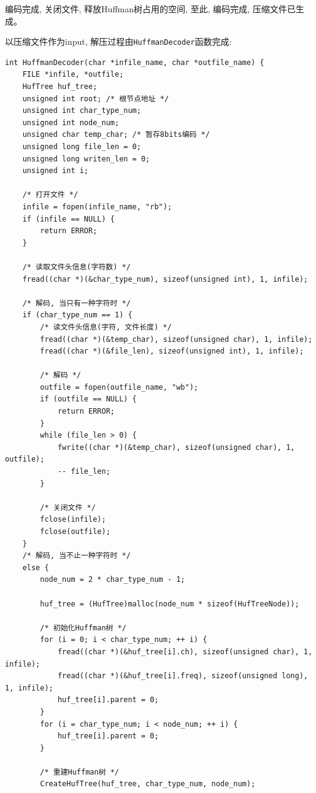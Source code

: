 \documentclass{ctexart}
\begin{document}
编码完成, 关闭文件, 释放Huffman树占用的空间, 至此, 编码完成, 压缩文件已生成。

以压缩文件作为input, 解压过程由\texttt{HuffmanDecoder}函数完成:

{\setmainfont{Courier New Bold}              
\begin{lstlisting}
int HuffmanDecoder(char *infile_name, char *outfile_name) {
    FILE *infile, *outfile;
    HufTree huf_tree;
    unsigned int root; /* 根节点地址 */
    unsigned int char_type_num;
    unsigned int node_num;
    unsigned char temp_char; /* 暂存8bits编码 */
    unsigned long file_len = 0;
    unsigned long writen_len = 0;
    unsigned int i;

    /* 打开文件 */
    infile = fopen(infile_name, "rb");
    if (infile == NULL) {
        return ERROR;
    }

    /* 读取文件头信息(字符数) */
    fread((char *)(&char_type_num), sizeof(unsigned int), 1, infile);

    /* 解码, 当只有一种字符时 */
    if (char_type_num == 1) {
        /* 读文件头信息(字符, 文件长度) */
        fread((char *)(&temp_char), sizeof(unsigned char), 1, infile);
        fread((char *)(&file_len), sizeof(unsigned int), 1, infile);

        /* 解码 */
        outfile = fopen(outfile_name, "wb");
        if (outfile == NULL) {
            return ERROR;
        }
        while (file_len > 0) {
            fwrite((char *)(&temp_char), sizeof(unsigned char), 1, outfile);
            -- file_len;
        }

        /* 关闭文件 */
        fclose(infile);
        fclose(outfile);
    }
    /* 解码, 当不止一种字符时 */
    else {
        node_num = 2 * char_type_num - 1;
        
        huf_tree = (HufTree)malloc(node_num * sizeof(HufTreeNode));

        /* 初始化Huffman树 */
        for (i = 0; i < char_type_num; ++ i) {
            fread((char *)(&huf_tree[i].ch), sizeof(unsigned char), 1, infile);
            fread((char *)(&huf_tree[i].freq), sizeof(unsigned long), 1, infile);
            huf_tree[i].parent = 0;
        }
        for (i = char_type_num; i < node_num; ++ i) {
            huf_tree[i].parent = 0;
        }

        /* 重建Huffman树 */
        CreateHufTree(huf_tree, char_type_num, node_num);


\end{lstlisting}}
\end{document}
